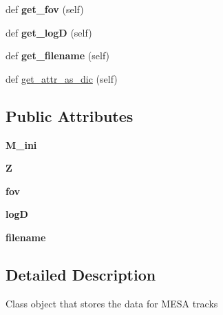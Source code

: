 \begin{DoxyCompactItemize}
\mbox{\label{classasamba_1_1var__def_1_1track_a15bd996fa8ef66ac4575a35ace31a0af}} 
def {\bfseries get\+\_\+fov} (self)
\item 
\mbox{\label{classasamba_1_1var__def_1_1track_ac9944e9e2c420b290800b89499a1b46e}} 
def {\bfseries get\+\_\+logD} (self)
\item 
\mbox{\label{classasamba_1_1var__def_1_1track_a481ec6ec42ef88569f7f7460e71a4301}} 
def {\bfseries get\+\_\+filename} (self)
\item 
def \hyperlink{classasamba_1_1var__def_1_1track_aec000211bbf1940b5c05b0bcd380fc2a}{get\+\_\+attr\+\_\+as\+\_\+dic} (self)
\end{DoxyCompactItemize}
\subsection*{Public Attributes}
\begin{DoxyCompactItemize}
\item 
\mbox{\label{classasamba_1_1var__def_1_1track_aa3dbc15bdcf66b74d94c7eec646d1130}} 
{\bfseries M\+\_\+ini}
\item 
\mbox{\label{classasamba_1_1var__def_1_1track_a2c417501a83649d928d086a3145ab209}} 
{\bfseries Z}
\item 
\mbox{\label{classasamba_1_1var__def_1_1track_a0f34b50e996c9be9d9f0832a25ab33cb}} 
{\bfseries fov}
\item 
\mbox{\label{classasamba_1_1var__def_1_1track_a76991863706f1d8838b4864957d50ddd}} 
{\bfseries logD}
\item 
\mbox{\label{classasamba_1_1var__def_1_1track_af8f0ad459781b31152e8a2329a788886}} 
{\bfseries filename}
\end{DoxyCompactItemize}


\subsection{Detailed Description}
\begin{DoxyVerb}Class object that stores the data for MESA tracks
\end{DoxyVerb}
 

